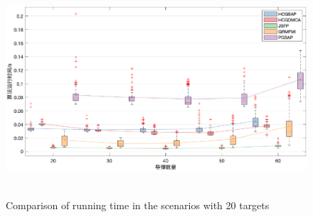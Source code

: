 \begin{figure}[!htp]
  \centering
  \includegraphics[height=8cm]{hedonic_game/BoxUnbalanceTimeV1}
    {Comparison of running time in the scenarios with 20 targets}
  \label{fig:20TargetsTime}
\end{figure}



